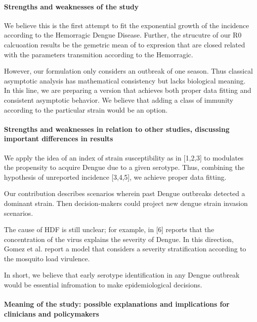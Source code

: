    \paragraph{Strengths and weaknesses of the study}
        We believe this is the first attempt to fit the exponential 
    growth of the incidence according to the Hemorragic Dengue Disease. 
    Further, the strucutre of our R0 calcuoation results be 
    the gemetric mean of to expresion that are closed related 
    with the parameters transmition according to the Hemorragic.  

    
        However, our formulation only considers an outbreak of one season.
    Thus classical asymptotic analysis has mathematical consistency
    but lacks biological meaning.  In this line, we are preparing a
    version that achieves both \textemdash proper data fitting and consistent
    asymptotic behavior. We believe that adding a class of immunity
    according to the particular strain would be an option.

    \paragraph{Strengths and weaknesses in relation 
        to other studies, discussing important
        differences in results}
        
        We apply the idea of an index of strain susceptibility as in [1,2,3] 
    to modulates the propensity to acquire Dengue due to a given serotype.  Thus,
    combining the hypothesis of unreported incidence [3,4,5], we achieve
    proper data fitting.

        Our contribution describes scenarios wherein past Dengue outbreaks
    detected a dominant strain. Then decision-makers could project new
    dengue strain invasion scenarios.

        The cause of HDF is still unclear; for example, in [6] reports that
    the concentration of the virus explains the severity of Dengue. In
    this direction, Gomez et al. report a model that considers a severity
    stratification according to the mosquito load virulence.

        In short, we believe that early serotype identification in any Dengue
    outbreak would be essential infromation to make epidemiological decisions.
    \paragraph{Meaning of the study: possible explanations 
    and implications for clinicians
    and policymakers}
